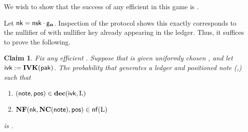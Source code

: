 \documentclass[11pt]{article}
\numberwithin{equation}{section} %
\numberwithin{figure}{section} %
\newtheorem{claim}[thm]{Claim}
\begin{document}
We wish to show that the success of any efficient \adv in this game is \negl.


Let $\mathsf{nk} =\mathsf{nsk}\cdot\mathsf{g}_{\mathbf{n}}$.
Inspection of the protocol shows this exactly corresponds to the nullifier of \note with nullifier key \nk already appearing in the ledger.
Thus, it suffices to prove the following.
\begin{claim}\label{sapling-spendability}
 Fix any efficient \adv.
 Suppose that \adv  is given uniformly chosen \pak, and let $\mathsf{ivk} := \mathbf{IVK}(\mathsf{pak})$.
The probability that \adv generates a ledger \ledger and positioned note (\note,\pos) such that 
 \begin{enumerate}
  \item $(\mathsf{note},\mathsf{pos})\in \mathsf{\mathbf{dec}}(\mathsf{ivk},\mathrm{L})$
  \item $\mathbf{NF}(\mathsf{nk},\mathbf{NC}(\mathsf{note}),\mathsf{pos})\in \mathsf{nf}(\mathrm{L})$ 
 \end{enumerate}
 is \negl.
\end{claim}
\end{document}
